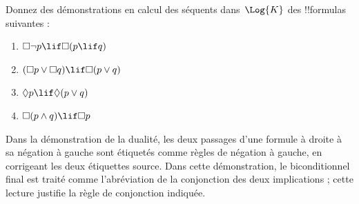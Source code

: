 \documentclass[../../../include/open-logic-section]{subfiles}
\begin{document}

\Writetofile{\jobname}{\string\Needspace{8\string\baselineskip}}
\begin{prob}
  Donnez des démonstrations en calcul des séquents dans~$\Log{K}$
  des !!{formula}s suivantes :
  \begin{enumerate}
    \item $\Box \lnot p \lif \Box(p \lif q)$
    \item $(\Box p \lor \Box q) \lif \Box(p \lor q)$
    \item $\Diamond p \lif \Diamond(p \lor q)$
    \item $\Box(p \land q) \lif \Box p$
  \end{enumerate}
\end{prob}
\begin{editorial}Dans la démonstration de la dualité, les deux passages d’une formule à droite à sa négation à gauche sont étiquetés comme règles de négation à gauche, en corrigeant les deux étiquettes source. Dans cette démonstration, le biconditionnel final est traité comme l’abréviation de la conjonction des deux implications ; cette lecture justifie la règle de conjonction indiquée.\end{editorial}
\end{document}
